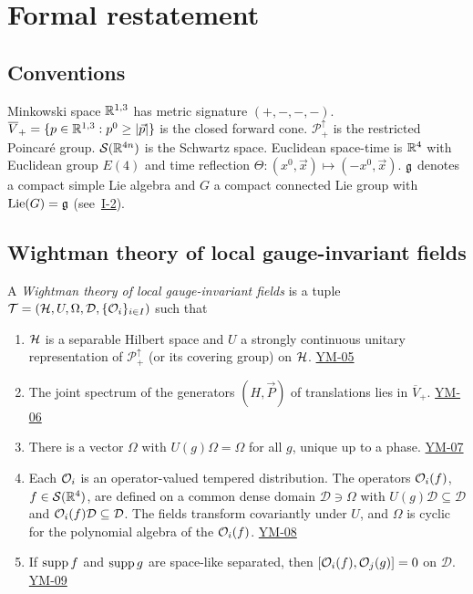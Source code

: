 \documentclass[11pt,a4paper]{article}
\newcommand{\idref}[1]{\hyperref[#1]{\textsf{#1}}}
\begin{document}
\section{Formal restatement}\label{sec:formal}

\subsection{Conventions}
Minkowski space $\mathbb R^{1,3}$ has metric signature $(+,-,-,-)$. $\overline V_+=\{p\in\mathbb R^{1,3}:p^0\ge|\vec p|\}$ is the closed forward cone. $\mathcal P_+^\uparrow$ is the restricted Poincar\'e group. $\mathcal S(\mathbb R^{4n})$ is the Schwartz space. Euclidean space-time is $\mathbb R^4$ with Euclidean group $E(4)$ and time reflection $\Theta:(x^0,\vec x)\mapsto(-x^0,\vec x)$. $\mathfrak g$ denotes a compact simple Lie algebra and $G$ a compact connected Lie group with $\operatorname{Lie}(G)=\mathfrak g$ (see~\idref{I-2}).

\subsection{Wightman theory of local gauge-invariant fields}

\begin{definition}\label{def:wightman}
A \emph{Wightman theory of local gauge-invariant fields} is a tuple $\mathcal T=(\mathcal H,U,\Omega,\mathcal D,\{\mathcal O_i\}_{i\in I})$ such that
\begin{enumerate}[label=\textup{(W\arabic*)},leftmargin=3.2em]
\item $\mathcal H$ is a separable Hilbert space and $U$ a strongly continuous unitary representation of $\mathcal P_+^\uparrow$ (or its covering group) on $\mathcal H$. \hfill\idref{YM-05}
\item The joint spectrum of the generators $(H,\vec P)$ of translations lies in $\overline V_+$. \hfill\idref{YM-06}
\item There is a vector $\Omega$ with $U(g)\Omega=\Omega$ for all $g$, unique up to a phase. \hfill\idref{YM-07}
\item Each $\mathcal O_i$ is an operator-valued tempered distribution. The operators $\mathcal O_i(f)$, $f\in\mathcal S(\mathbb R^4)$, are defined on a common dense domain $\mathcal D\ni\Omega$ with $U(g)\mathcal D\subseteq\mathcal D$ and $\mathcal O_i(f)\mathcal D\subseteq\mathcal D$. The fields transform covariantly under $U$, and $\Omega$ is cyclic for the polynomial algebra of the $\mathcal O_i(f)$. \hfill\idref{YM-08}
\item If $\operatorname{supp} f$ and $\operatorname{supp} g$ are space-like separated, then $[\mathcal O_i(f),\mathcal O_j(g)]=0$ on $\mathcal D$. \hfill\idref{YM-09}
\end{enumerate}
\end{definition}
\end{document}
